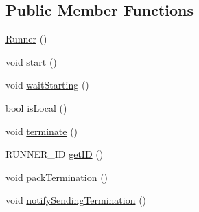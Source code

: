 \subsection*{Public Member Functions}
\begin{CompactItemize}
\item 
\hypertarget{classRunner_7acb8258c21da9daa62f9a177a2e5acd}{
\hyperlink{classRunner_7acb8258c21da9daa62f9a177a2e5acd}{Runner} ()}
\label{classRunner_7acb8258c21da9daa62f9a177a2e5acd}

\item 
\hypertarget{classRunner_7dc4419051fcc5cc9dadd54ecc9cd47d}{
void \hyperlink{classRunner_7dc4419051fcc5cc9dadd54ecc9cd47d}{start} ()}
\label{classRunner_7dc4419051fcc5cc9dadd54ecc9cd47d}

\item 
\hypertarget{classRunner_5bc239db2be753b77369fa9a038769fd}{
void \hyperlink{classRunner_5bc239db2be753b77369fa9a038769fd}{wait\-Starting} ()}
\label{classRunner_5bc239db2be753b77369fa9a038769fd}

\item 
\hypertarget{classRunner_40adbfb7d6944189b4fff60b02e669ca}{
bool \hyperlink{classRunner_40adbfb7d6944189b4fff60b02e669ca}{is\-Local} ()}
\label{classRunner_40adbfb7d6944189b4fff60b02e669ca}

\item 
\hypertarget{classRunner_0f133e75c28fb8264549814f80608e68}{
void \hyperlink{classRunner_0f133e75c28fb8264549814f80608e68}{terminate} ()}
\label{classRunner_0f133e75c28fb8264549814f80608e68}

\item 
\hypertarget{classRunner_5026c74eec184e3a15cb3c0ec4200a57}{
RUNNER\_\-ID \hyperlink{classRunner_5026c74eec184e3a15cb3c0ec4200a57}{get\-ID} ()}
\label{classRunner_5026c74eec184e3a15cb3c0ec4200a57}

\item 
\hypertarget{classRunner_2ad6d199d684d6f34347fc202ffe2fa3}{
void \hyperlink{classRunner_2ad6d199d684d6f34347fc202ffe2fa3}{pack\-Termination} ()}
\label{classRunner_2ad6d199d684d6f34347fc202ffe2fa3}

\item 
\hypertarget{classRunner_3591be473e0fcee1105fb57319b529aa}{
void \hyperlink{classRunner_3591be473e0fcee1105fb57319b529aa}{notify\-Sending\-Termination} ()}
\label{classRunner_3591be473e0fcee1105fb57319b529aa}

\end{CompactItemize}
